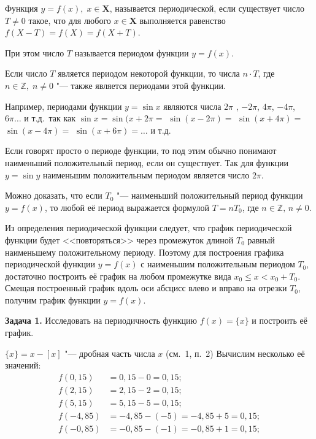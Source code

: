 \begin{Def}
Функция $y = f(x), \; x \in \mathbf{X}$, называется периодической, если
существует число $T \ne 0$ такое, что для любого $x \in \mathbf{X}$
выполняется равенство 
$f(X - T) = f(X) = f(X + T)$.
\end{Def}

При этом число $T$ называется периодом функции $y = f(x)$.

Если число $T$ является периодом некоторой функции, то числа $n \cdot T$,
где $n \in \mathbb{Z}, \; n \ne 0$ "--- также является периодами этой функции.

Например, периодами функции $y = \sin x$ являются числа $2\pi$ , $-2\pi$,
$4\pi$, $-4\pi$, $6\pi \dots$ и т.д.\ так как
$\sin x = \sin (x + 2\pi =$ $\sin (x -2\pi)=$ $\sin (x + 4\pi)=$
$\sin (x - 4\pi)=$ $\sin (x + 6\pi)= \dots$ и т.д.

Если говорят просто о периоде функции, то под этим обычно понимают
наименьший положительный период, если он существует.
Так для функции $y = \sin y$ наименьшим положительным периодом является
число $2\pi$.

Можно доказать, что если $T_{0}$ "--- наименьший положительный период
функции $y = f(x)$, то любой её период выражается формулой
$T = nT_{0}$, где $n \in \mathbb{Z}, \, n \ne 0$.

Из определения периодической функции следует, что график периодической функции
будет <<повторяться>> через промежуток длиной $T_{0}$ равный наименьшему
положительному периоду. Поэтому для построения графика периодической функции
$y = f(x)$ с наименьшим положительным периодом $T_{0}$, достаточно построить
её график на любом промежутке вида $x_{0} \leqslant x < x_{0} + T_{0}$.
Смещая построенный график вдоль оси абсцисс влево и вправо на отрезки $T_{0}$,
получим график функции $y = f(x)$.

\textbf{Задача 1.} Исследовать на периодичность функцию $f(x) = \{x\}$
и построить её график.

$\{x\} = x - [x]$ "--- дробная часть числа $x$ (см.\ 1, п.\ 2)
Вычислим несколько её значений:
\begin{align*}
f(0{,}15) &= 0{,}15 - 0 = 0{,}15; \\
f(2{,}15) &= 2{,}15 - 2 = 0{,}15; \\
f(5{,}15) &= 5{,}15 - 5 = 0{,}15; \\
f(-4{,}85) &= -4{,}85 - (-5) = -4{,}85 + 5 = 0{,}15; \\
f(-0{,}85) &= -0{,}85 - (-1) = -0{,}85 + 1 = 0{,}15; \\
\end{align*}

